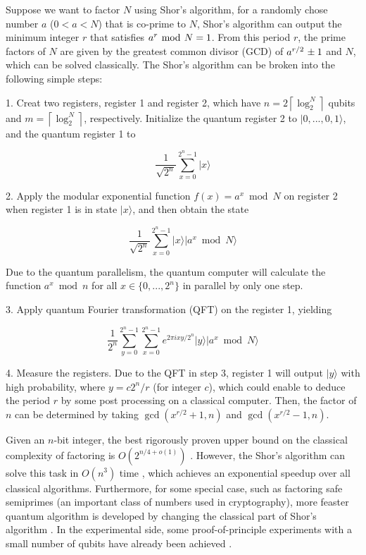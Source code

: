 \documentclass[aps,pra,singlecolumn,superscriptaddress]{revtex4-1}
\begin{document}
Suppose we want to factor $N$ using Shor's algorithm, for a randomly chose number ${a}$ ($0<a<N$) that is co-prime to $N$, Shor's algorithm can output the minimum integer $r$ that satisfies ${{a^r}{\kern 1pt} \bmod {\kern 1pt} N = 1}$.  From this period $r$, the prime factors of $N$ are given by the greatest common divisor (GCD) of ${{a^{r/2}}{\kern 1pt}  \pm 1}$ and ${N}$, which can be solved classically. The Shor's algorithm can be broken into the following simple steps:

1. Creat two registers, register 1 and register 2, which have  $n=2\left\lceil {\log _2^N} \right\rceil$ qubits and $m=\left\lceil {\log _2^N} \right\rceil$, respectively. Initialize the quantum register 2 to $|0,...,0,1\rangle$, and the quantum register 1 to

\[\frac{1}{{\sqrt {{2^n}} }}\sum\limits_{x = 0}^{{2^n} - 1} {|x\rangle }\]


2. Apply the modular exponential function $f(x) = {a^x}\bmod N$ on register 2 when register 1 is in state $|x\rangle$, and then obtain the state

\[\frac{1}{{\sqrt {{2^n}} }}\sum\limits_{x = 0}^{{2^n} - 1} {|x\rangle|{a^x}\bmod N\rangle }\]

Due to the quantum parallelism, the quantum computer will calculate the function $a^{x} \bmod n$ for all $x \in \{ 0,...,{2^n}\}$ in parallel by only one step.

3. Apply quantum Fourier transformation (QFT) on the register 1, yielding

\[\frac{1}{{{2^n}}}\sum\limits_{y = 0}^{{2^n} - 1} {\sum\limits_{x = 0}^{{2^n} - 1} {{e^{2\pi ixy/{2^n}}}|y\rangle |{a^x}\bmod N\rangle } } \]

4. Measure the registers. Due to the QFT in step 3, register 1 will output $|y\rangle$ with high probability, where $y = c{2^n}/r$ (for integer $c$), which could enable to deduce the period $r$ by some post processing on a classical computer. Then, the factor of $n$ can be determined by taking $\gcd(x^{r/2} + 1, n)$ and  $\gcd(x^{r/2} - 1, n)$.

Given an $n$-bit integer, the best rigorously proven upper bound on the classical complexity of factoring is $O({2^{n/4 + o(1)}})$ \cite{pollard1974theorems, strassen1976einige}. However, the Shor's algorithm can solve this task in $O({n^3})$ time \cite{shor1997polynomial,shor1994algorithms}, which achieves an exponential speedup over all classical algorithms.  Furthermore, for some special case, such as factoring safe semiprimes (an important class of numbers used in cryptography), more feaster quantum algorithm is developed by changing the classical part of Shor's algorithm \cite{grosshans2015factoring}. In the experimental side, some proof-of-principle experiments with a small number of qubits have already been achieved \cite{monz2016realization, lucero2012computing, martin2012experimental, politi2009shor, lu2007demonstration, lanyon2007experimental, vandersypen2001experimental, johansson2017realization, huang2017experimental}.
\end{document}
